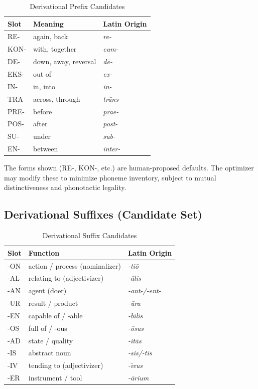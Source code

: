 \documentclass[12pt]{book}
\begin{document}
\begin{table}[h]
\centering
\caption{Derivational Prefix Candidates}
\label{tab:prefixes}
\begin{tabular}{@{}lll@{}}
\toprule
Slot   & Meaning              & Latin Origin \\
\midrule
RE-    & again, back          & \emph{re-}   \\
KON-   & with, together       & \emph{cum-}  \\
DE-    & down, away, reversal & \emph{d\={e}-} \\
EKS-   & out of               & \emph{ex-}   \\
IN-    & in, into             & \emph{in-}   \\
TRA-   & across, through      & \emph{tr\={a}ns-} \\
PRE-   & before               & \emph{prae-} \\
POS-   & after                & \emph{post-} \\
SU-    & under                & \emph{sub-}  \\
EN-    & between              & \emph{inter-} \\
\bottomrule
\end{tabular}
\end{table}

\noindent The forms shown (RE-, KON-, etc.) are human-proposed defaults.
The optimizer may modify these to minimize phoneme inventory, subject to
mutual distinctiveness and phonotactic legality.

\subsection{Derivational Suffixes (Candidate Set)}

\begin{table}[h]
\centering
\caption{Derivational Suffix Candidates}
\label{tab:suffixes}
\begin{tabular}{@{}lll@{}}
\toprule
Slot   & Function                     & Latin Origin \\
\midrule
-ON    & action / process (nominalizer) & \emph{-ti\={o}} \\
-AL    & relating to (adjectivizer)     & \emph{-\={a}lis} \\
-AN    & agent (doer)                   & \emph{-ant-/-ent-} \\
-UR    & result / product               & \emph{-\={u}ra} \\
-EN    & capable of / -able             & \emph{-bilis} \\
-OS    & full of / -ous                 & \emph{-\={o}sus} \\
-AD    & state / quality                & \emph{-it\={a}s} \\
-IS    & abstract noun                  & \emph{-sis/-tis} \\
-IV    & tending to (adjectivizer)      & \emph{-\={\i}vus} \\
-ER    & instrument / tool              & \emph{-\={a}rium} \\
\bottomrule
\end{tabular}
\end{table}
\end{document}
